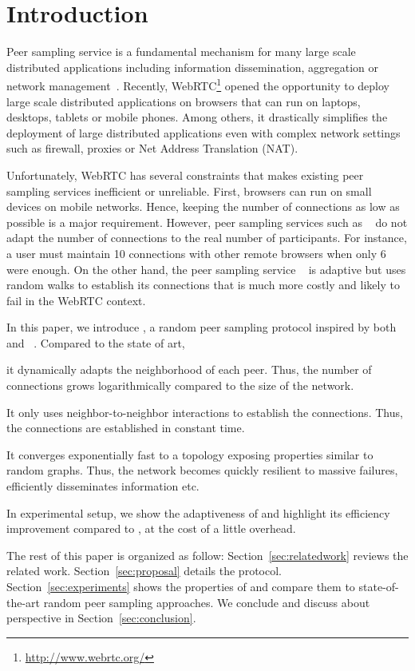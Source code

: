 
\section{Introduction}

Peer sampling service is a fundamental mechanism for many large scale
distributed applications including information dissemination, aggregation
 or network management~\cite{jelasity2007gossip}. Recently,
WebRTC\footnote{\url{http://www.webrtc.org/}} opened the opportunity to deploy large scale distributed
applications on browsers that can run on laptops, desktops, tablets or mobile
phones. Among others, it drastically simplifies the deployment of large
distributed applications even with complex network settings such as firewall,
proxies or Net Address Translation (NAT).

Unfortunately, WebRTC has several constraints that makes existing peer
sampling services inefficient or unreliable. First, browsers can run
on small devices on mobile networks. Hence, keeping the number of
connections as low as possible is a major requirement. However, peer
sampling services such as \CYCLON{}~\cite{voulgaris2005cyclon} do not
adapt the number of connections to the real number of
participants. For instance, a user must maintain 10 connections with
other remote browsers when only 6 were enough. On the other hand, the
peer sampling service \SCAMP{}~\cite{ganesh2003peer} is adaptive but
uses random walks to establish its connections that is much more
costly and likely to fail in the WebRTC context.

In this paper, we introduce \SPRAY{}, a random peer sampling protocol inspired
by both \CYCLON{}~\cite{voulgaris2005cyclon} and
\SCAMP{}~\cite{ganesh2003peer}. Compared to the state of art,
\begin{inparaenum}[(i)]
\item it dynamically adapts the neighborhood of each peer. Thus, the number of
  connections grows logarithmically compared to the size of the network.
\item It only uses neighbor-to-neighbor interactions to establish the
  connections. Thus, the connections are established in constant time.
\item It converges exponentially fast to a topology exposing properties similar
  to random graphs. Thus, the network becomes quickly resilient to massive
  failures, efficiently disseminates information etc.
\item In experimental setup, we show the adaptiveness of \SPRAY{} and
  highlight its efficiency improvement compared to \CYCLON{}, at the cost of a
  little overhead.
\end{inparaenum}

The rest of this paper is organized as follow: Section~\ref{sec:relatedwork}
reviews the related work. Section~\ref{sec:proposal} details the \SPRAY{}
protocol.  Section~\ref{sec:experiments} shows the properties of \SPRAY{}
and compare them to state-of-the-art random peer sampling approaches. We
conclude and discuss about perspective in Section~\ref{sec:conclusion}.


